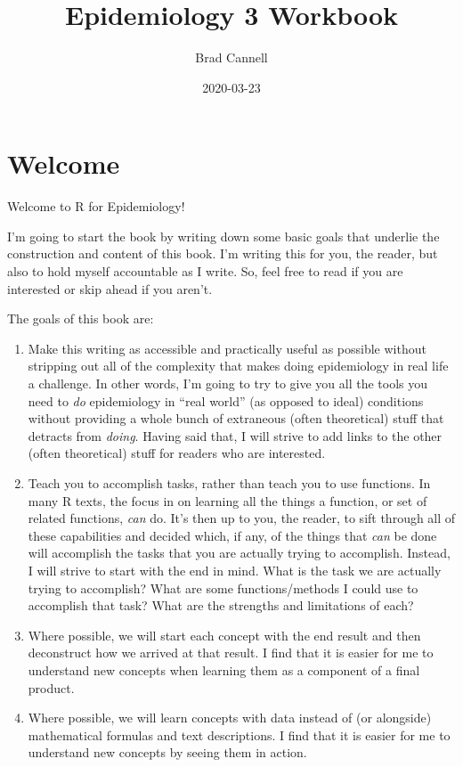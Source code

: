 \documentclass[]{book}
\title{Epidemiology 3 Workbook}
\author{Brad Cannell}
\date{2020-03-23}
\begin{document}
\maketitle

{
\setcounter{tocdepth}{1}
\tableofcontents
}
\hypertarget{welcome}{%
\chapter*{Welcome}\label{welcome}}

Welcome to R for Epidemiology!

I'm going to start the book by writing down some basic goals that underlie the construction and content of this book. I'm writing this for you, the reader, but also to hold myself accountable as I write. So, feel free to read if you are interested or skip ahead if you aren't.

The goals of this book are:

\begin{enumerate}
\def\labelenumi{\arabic{enumi}.}
\item
  Make this writing as accessible and practically useful as possible without stripping out all of the complexity that makes doing epidemiology in real life a challenge. In other words, I'm going to try to give you all the tools you need to \emph{do} epidemiology in ``real world'' (as opposed to ideal) conditions without providing a whole bunch of extraneous (often theoretical) stuff that detracts from \emph{doing}. Having said that, I will strive to add links to the other (often theoretical) stuff for readers who are interested.
\item
  Teach you to accomplish tasks, rather than teach you to use functions. In many R texts, the focus in on learning all the things a function, or set of related functions, \emph{can} do. It's then up to you, the reader, to sift through all of these capabilities and decided which, if any, of the things that \emph{can} be done will accomplish the tasks that you are actually trying to accomplish. Instead, I will strive to start with the end in mind. What is the task we are actually trying to accomplish? What are some functions/methods I could use to accomplish that task? What are the strengths and limitations of each?
\item
  Where possible, we will start each concept with the end result and then deconstruct how we arrived at that result. I find that it is easier for me to understand new concepts when learning them as a component of a final product.
\item
  Where possible, we will learn concepts with data instead of (or alongside) mathematical formulas and text descriptions. I find that it is easier for me to understand new concepts by seeing them in action.
\end{enumerate}
\end{document}
